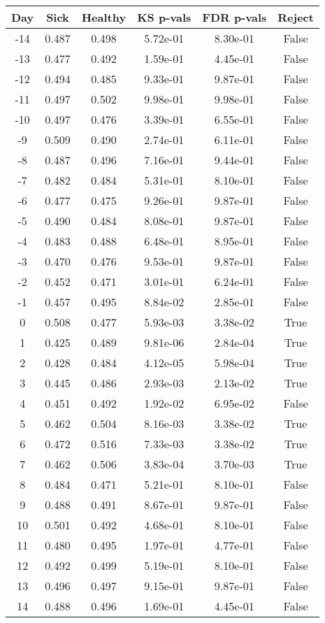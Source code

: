\begin{tabular}{c|c|c|c|c|c}
Day &  Sick & Healthy &  KS p-vals & FDR p-vals & Reject\\
\hline
-14 & 0.487 &   0.498 &   5.72e-01 &   8.30e-01 &  False\\
-13 & 0.477 &   0.492 &   1.59e-01 &   4.45e-01 &  False\\
-12 & 0.494 &   0.485 &   9.33e-01 &   9.87e-01 &  False\\
-11 & 0.497 &   0.502 &   9.98e-01 &   9.98e-01 &  False\\
-10 & 0.497 &   0.476 &   3.39e-01 &   6.55e-01 &  False\\
 -9 & 0.509 &   0.490 &   2.74e-01 &   6.11e-01 &  False\\
 -8 & 0.487 &   0.496 &   7.16e-01 &   9.44e-01 &  False\\
 -7 & 0.482 &   0.484 &   5.31e-01 &   8.10e-01 &  False\\
 -6 & 0.477 &   0.475 &   9.26e-01 &   9.87e-01 &  False\\
 -5 & 0.490 &   0.484 &   8.08e-01 &   9.87e-01 &  False\\
 -4 & 0.483 &   0.488 &   6.48e-01 &   8.95e-01 &  False\\
 -3 & 0.470 &   0.476 &   9.53e-01 &   9.87e-01 &  False\\
 -2 & 0.452 &   0.471 &   3.01e-01 &   6.24e-01 &  False\\
 -1 & 0.457 &   0.495 &   8.84e-02 &   2.85e-01 &  False\\
  0 & 0.508 &   0.477 &   5.93e-03 &   3.38e-02 &   True\\
  1 & 0.425 &   0.489 &   9.81e-06 &   2.84e-04 &   True\\
  2 & 0.428 &   0.484 &   4.12e-05 &   5.98e-04 &   True\\
  3 & 0.445 &   0.486 &   2.93e-03 &   2.13e-02 &   True\\
  4 & 0.451 &   0.492 &   1.92e-02 &   6.95e-02 &  False\\
  5 & 0.462 &   0.504 &   8.16e-03 &   3.38e-02 &   True\\
  6 & 0.472 &   0.516 &   7.33e-03 &   3.38e-02 &   True\\
  7 & 0.462 &   0.506 &   3.83e-04 &   3.70e-03 &   True\\
  8 & 0.484 &   0.471 &   5.21e-01 &   8.10e-01 &  False\\
  9 & 0.488 &   0.491 &   8.67e-01 &   9.87e-01 &  False\\
 10 & 0.501 &   0.492 &   4.68e-01 &   8.10e-01 &  False\\
 11 & 0.480 &   0.495 &   1.97e-01 &   4.77e-01 &  False\\
 12 & 0.492 &   0.499 &   5.19e-01 &   8.10e-01 &  False\\
 13 & 0.496 &   0.497 &   9.15e-01 &   9.87e-01 &  False\\
 14 & 0.488 &   0.496 &   1.69e-01 &   4.45e-01 &  False\\
\end{tabular}